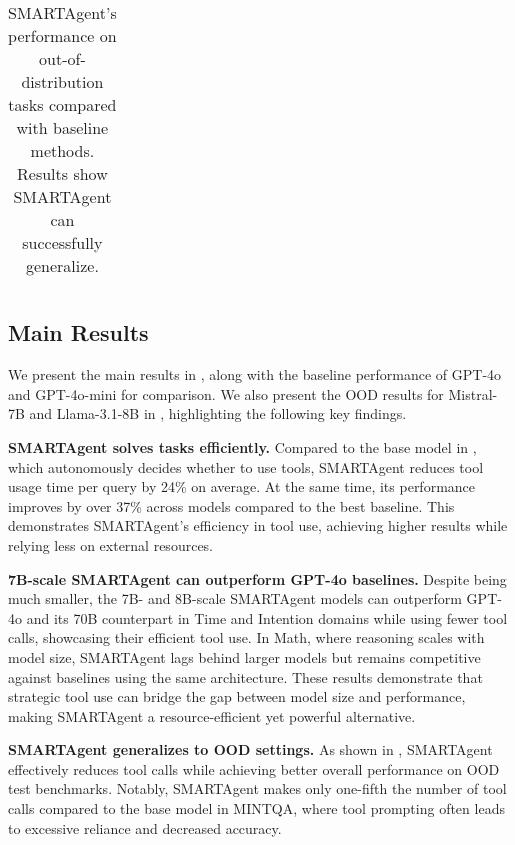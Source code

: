 \begin{table}[t]
{\begin{tabular}{l c c @{\hskip 14pt} c c}
        \bottomrule
    \end{tabular}
    }
    \label{tab:results_ood}
    \caption{
    SMARTAgent's performance on out-of-distribution tasks compared with baseline methods. Results show SMARTAgent can successfully generalize.
    }
\end{table}


\subsection{Main Results}
We present the main results in , along with the baseline performance of GPT-4o and GPT-4o-mini for comparison. We also present the OOD results for Mistral-7B and Llama-3.1-8B in , highlighting the following key findings.

\vspace{1.5mm}
\noindent\textbf{SMARTAgent solves tasks efficiently.}
Compared to the base model in , which autonomously decides whether to use tools, SMARTAgent reduces tool usage time per query by 24\% on average. At the same time, its performance improves by over 37\% across models compared to the best baseline. This demonstrates SMARTAgent's efficiency in tool use, achieving higher results while relying less on external resources.

\vspace{1.5mm}
\noindent\textbf{7B-scale SMARTAgent can outperform GPT-4o baselines.}
Despite being much smaller, the 7B- and 8B-scale SMARTAgent models can outperform GPT-4o and its 70B counterpart in Time and Intention domains while using fewer tool calls, showcasing their efficient tool use. In Math, where reasoning scales with model size, SMARTAgent lags behind larger models but remains competitive against baselines using the same architecture. These results demonstrate that strategic tool use can bridge the gap between model size and performance, making SMARTAgent a resource-efficient yet powerful alternative.

\vspace{1.5mm}
\noindent\textbf{SMARTAgent generalizes to OOD settings.}
As shown in , SMARTAgent effectively reduces tool calls while achieving better overall performance on OOD test benchmarks. Notably, SMARTAgent makes only one-fifth the number of tool calls compared to the base model in MINTQA, where tool prompting often leads to excessive reliance and decreased accuracy.

